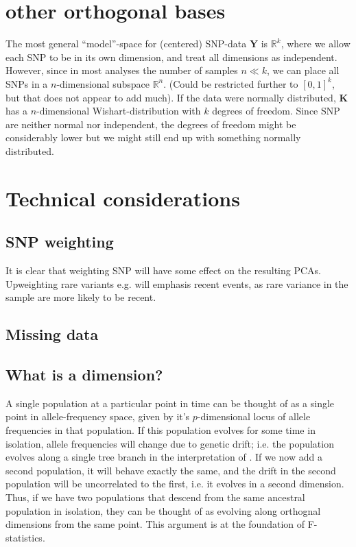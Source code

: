 \documentclass[10pt,a4paper]{article}
\newcommand{\MY}{\mathbf{Y}} %
\newcommand{\MK}{\mathbf{K}} %
\begin{document}
\section{other orthogonal bases}
The most general ``model''-space for (centered) SNP-data $\MY$ is $\mathbb{R}^k$, where we allow each SNP to be in its own dimension, and treat all dimensions as independent. However, since in most analyses the number of samples $n \ll k$, we can place all SNPs in a $n$-dimensional subspace $\mathbb{R}^n$. (Could be restricted further to $[0,1]^k$, but that does not appear to add much).
If the data were normally distributed, $\MK$ has a $n$-dimensional Wishart-distribution with $k$ degrees of freedom. Since SNP are neither normal nor independent, the degrees of freedom might be considerably lower but we might still end up with something normally distributed.






	
\section{Technical considerations}
	\subsection{SNP weighting}
	It is clear that weighting SNP will have some effect on the resulting PCAs. Upweighting rare variants e.g. will emphasis recent events, as rare variance in the sample are more likely to be recent.
	
	
	\subsection{Missing data}
	
	\subsection{What is a dimension?}
	A single population at a particular point in time can be thought of as a single point in allele-frequency space, given by it's $p$-dimensional locus of allele frequencies in that population. If this population evolves for some time in isolation, allele frequencies will change due to genetic drift; i.e. the population evolves along a single tree branch in the interpretation of \cite{patterson2012}. If we now add a second population, it will behave exactly the same, and the drift in the second population will be uncorrelated to the first, i.e. it evolves in a second dimension. Thus, if we have two populations that descend from the same ancestral population in isolation, they can be thought of as evolving along orthognal dimensions from the same point. This argument is at the foundation of F-statistics.
	
\end{document}
